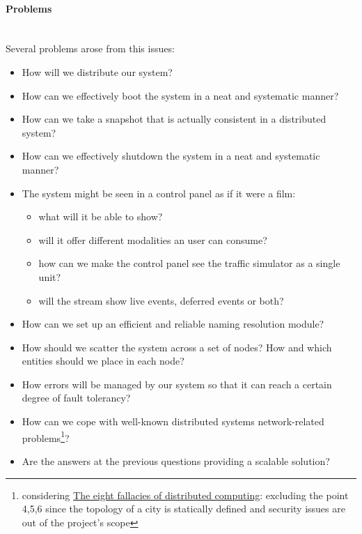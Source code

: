 \paragraph{Problems} \mbox{} \\

Several problems arose from this issues:

\begin{itemize}
\item How will we distribute our system?
\item How can we effectively boot the system in a neat and systematic manner?
\item How can we take a snapshot that is actually consistent in a distributed
  system?
\item How can we effectively shutdown the system in a neat and systematic
  manner?
\item The system might be seen in a control panel as if it were a film:
  \begin{itemize}
  \item what will it be able to show?
  \item will it offer different modalities an user can consume?
  \item how can we make the control panel see the traffic simulator as a
    single unit?
  \item will the stream show live events, deferred events or both?
  \end{itemize}
\item How can we set up an efficient and reliable naming resolution module?
\item How should we scatter the system across a set of nodes? How and which
  entities should we place in each node?
\item How errors will be managed by our system so that it can reach a certain
  degree of fault tolerancy?
\item How can we cope with well-known distributed systems network-related
  problems\footnote{considering \href{https://blogs.oracle.com/jag/resource/Fallacies.html?cm_mc_uid=82650292107114582847614&cm_mc_sid_50200000=1458564821}{The eight fallacies of distributed computing}: excluding the point 4,5,6
  since the topology of a city is statically defined and security issues are
  out of the project's scope}?
\item Are the answers at the previous questions providing a scalable solution?
\end{itemize}


